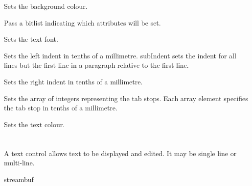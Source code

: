 Sets the background colour.


\label{wxtextattrsetflags}


Pass a bitlist indicating which attributes will be set.


\label{wxtextattrsetfont}


Sets the text font.


\label{wxtextattrsetleftindent}


Sets the left indent in tenths of a millimetre.
subIndent sets the indent for all lines but the first line in a paragraph
relative to the first line.


\label{wxtextattrsetrightindent}


Sets the right indent in tenths of a millimetre.


\label{wxtextattrsettabs}


Sets the array of integers representing the tab stops. Each
array element specifies the tab stop in tenths of a millimetre.


\label{wxtextattrsettextcolour}


Sets the text colour.



\section{}\label{wxtextctrl}

A text control allows text to be displayed and edited. It may be
single line or multi-line.


streambuf\\
\\
\\
\\

